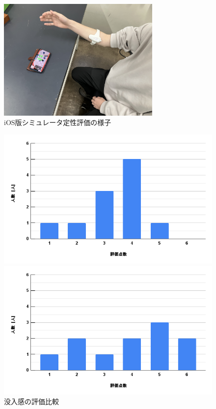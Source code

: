 \documentclass{ltjsreport}
\begin{document}
		\begin{figure}[H]
		\centering
		\includegraphics[width = 8cm]{../figs/IMG_6323.jpg}
		\caption{iOS版シミュレータ定性評価の様子}
		\label{fig:evaluationiOS}
		\end{figure}

		\begin{figure}[H]
		\centering
		\begin{minipage}{0.75\columnwidth}
		\centering
		\includegraphics[width = \columnwidth]{../figs/PC-1.png}
		\end{minipage}
		\hspace{0.04\columnwidth}
		\begin{minipage}{0.75\columnwidth}
		\centering
		\includegraphics[width = \columnwidth]{../figs/iOS-1.png}
		\end{minipage}
		\caption{没入感の評価比較}
		\end{figure}
\end{document}
